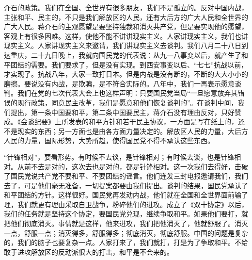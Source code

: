 介石的政策。我们在全国、全世界有很多朋友，我们不是孤立的。反对中国内战，主张和平、民主的，不只是我们解放区的人民，还有大后方的广大人民和全世界的广大人民。蒋介石的主观愿望是要坚持独裁和消灭共产党，但是要实现他的愿望，客观上有很多困难。这样，使他不能不讲讲现实主义。人家讲现实主义，我们也讲现实主义。人家讲现实主义来邀请，我们讲现实主义去谈判。我们八月二十八日到达重庆，二十九日晚上，我就向国民党的代表说：从九一八事变以后，就产生了和平团结的需要。我们要求了，但是没有实现。到西安事变以后、“七七”抗战以前，才实现了。抗战八年，大家一致打日本。但是内战是没有断的，不断的大大小小的磨擦。要说没有内战，是欺骗，是不符合实际的。八年中，我们一再表示愿意谈判。我们在党的七次代表大会上也这样声明：只要国民党当局“一旦愿意放弃其错误的现行政策，同意民主改革，我们是愿意和他们恢复谈判的”。在谈判中间，我们提出，第一条中国要和平，第二条中国要民主，蒋介石没有理由反对，只好赞成。《会谈纪要》上所发表的和平方针和若干民主协议，一方面是写在纸上的，还不是现实的东西；另一方面也是由各方面力量决定的。解放区人民的力量，大后方人民的力量，国际形势，大势所趋，使得国民党不得不承认这些东西。

“针锋相对”，要看形势。有时候不去谈，是针锋相对；有时候去谈，也是针锋相对。从前不去是对的，这次去也是对的，都是针锋相对。这一次我们去得好，击破了国民党说共产党不要和平、不要团结的谣言。他们连发三封电报邀请我们，我们去了，可是他们毫无准备，一切提案都要由我们提出。谈判的结果，国民党承认了和平团结的方针。这样很好。国民党再发动内战，他们就在全国和全世界面前输了理，我们就更有理由采取自卫战争，粉碎他们的进攻。成立了《双十协定》以后，我们的任务就是坚持这个协定，要国民党兑现，继续争取和平。如果他们要打，就把他们彻底消灭。事情就是这样，他来进攻，我们把他消灭了，他就舒服了。消灭一点，舒服一点；消灭得多，舒服得多；彻底消灭，彻底舒服。中国的问题是复杂的，我们的脑子也要复杂一点。人家打来了，我们就打，打是为了争取和平。不给敢于进攻解放区的反动派很大的打击，和平是不会来的。

